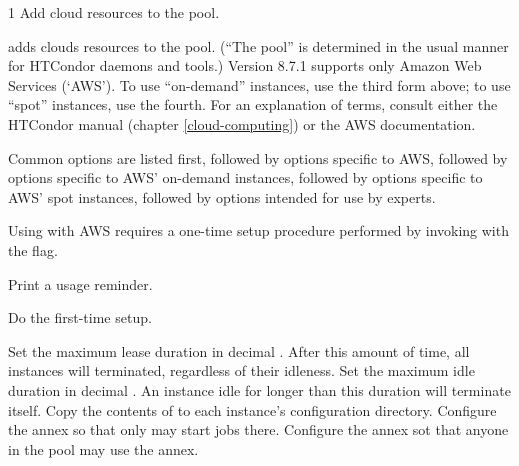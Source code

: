 \begin{ManPage}{\label{man-condor-annex}}{1}
{Add cloud resources to the pool.}

\Synopsis

 

 

 

 

\Description

 adds clouds resources to the pool.  (``The pool'' is determined
in the usual manner for HTCondor daemons and tools.)  Version 8.7.1 supports
only Amazon Web Services (`AWS').  To use ``on-demand'' instances, use
the third form above; to use ``spot'' instances, use the fourth.  For an
explanation of terms, consult either the HTCondor manual
(chapter \ref{cloud-computing}) or the AWS documentation.

Common options are listed first, followed by options specific to AWS,
followed by options specific to AWS' on-demand instances, followed by
options specific to AWS' spot instances, followed by options intended
for use by experts.

Using  with AWS requires a one-time setup procedure
performed by invoking  with the  flag.

\begin{Options}
		{Print a usage reminder.}

		{Do the first-time setup.}

		{Set the maximum lease duration in decimal .  After this amount of time, all instances will terminated, regardless of their idleness.}
		{Set the maximum idle duration in decimal .  An instance idle for longer than this duration will terminate itself. }
		{Copy the contents of  to each instance's configuration directory.}
		{Configure the annex so that only  may start jobs there.}
		{Configure the annex sot that anyone in the pool may use the annex.}


\end{Options}
\end{ManPage}
